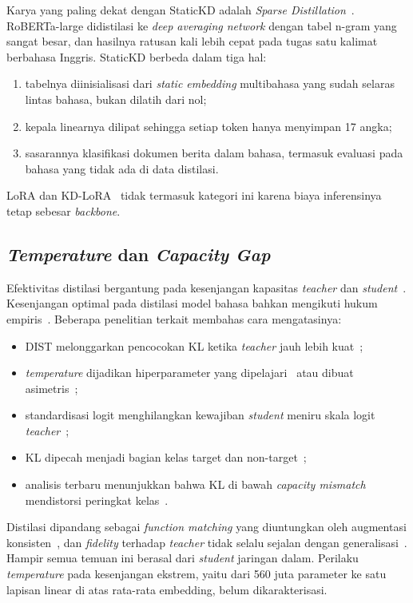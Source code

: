\documentclass[journal]{IEEEtran}
\newcommand{\eng}[1]{\textit{#1}}   %
\begin{document}
Karya yang paling dekat dengan StaticKD adalah \eng{Sparse Distillation}~\cite{ye2022sparse}. RoBERTa-large didistilasi ke \eng{deep averaging network} dengan tabel n-gram yang sangat besar, dan hasilnya ratusan kali lebih cepat pada tugas satu kalimat berbahasa Inggris. StaticKD berbeda dalam tiga hal:
\begin{enumerate}
  \item tabelnya diinisialisasi dari \eng{static embedding} multibahasa yang sudah selaras lintas bahasa, bukan dilatih dari nol;
  \item kepala linearnya dilipat sehingga setiap token hanya menyimpan 17 angka;
  \item sasarannya klasifikasi dokumen berita dalam  bahasa, termasuk evaluasi pada bahasa yang tidak ada di data distilasi.
\end{enumerate}
LoRA dan KD-LoRA~\cite{hu2022lora,azimi2024kdlora,razuvayevskaya2024peft,ding2023peft} tidak termasuk kategori ini karena biaya inferensinya tetap sebesar \eng{backbone}.

\subsection{\eng{Temperature} dan \eng{Capacity Gap}}
Efektivitas distilasi bergantung pada kesenjangan kapasitas \eng{teacher} dan \eng{student}~\cite{cho2019efficacy,mirzadeh2020ta}. Kesenjangan optimal pada distilasi model bahasa bahkan mengikuti hukum empiris~\cite{zhang2025law,zhang2023lifting}. Beberapa penelitian terkait membahas cara mengatasinya:
\begin{itemize}
  \item DIST melonggarkan pencocokan KL ketika \eng{teacher} jauh lebih kuat~\cite{huang2022dist};
  \item \eng{temperature} dijadikan hiperparameter yang dipelajari~\cite{li2023ctkd} atau dibuat asimetris~\cite{li2022ats};
  \item standardisasi logit menghilangkan kewajiban \eng{student} meniru skala logit \eng{teacher}~\cite{sun2024logit};
  \item KL dipecah menjadi bagian kelas target dan non-target~\cite{zhao2022dkd};
  \item analisis terbaru menunjukkan bahwa KL di bawah \eng{capacity mismatch} mendistorsi peringkat kelas~\cite{wang2026rckd}.
\end{itemize}
Distilasi dipandang sebagai \eng{function matching} yang diuntungkan oleh augmentasi konsisten~\cite{beyer2022patient}, dan \eng{fidelity} terhadap \eng{teacher} tidak selalu sejalan dengan generalisasi~\cite{stanton2021kd,ojha2023knowledge}. Hampir semua temuan ini berasal dari \eng{student} jaringan dalam. Perilaku \eng{temperature} pada kesenjangan ekstrem, yaitu dari 560 juta parameter ke satu lapisan linear di atas rata-rata embedding, belum dikarakterisasi.
\end{document}
